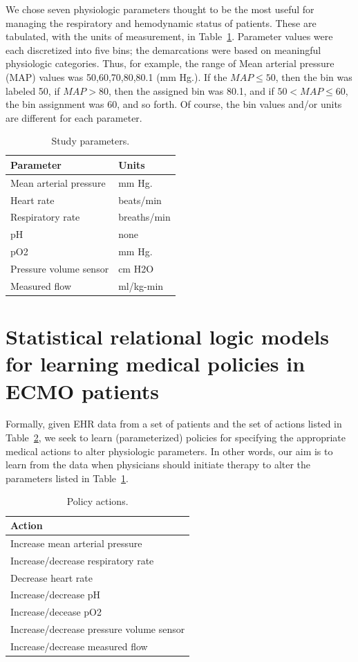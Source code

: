 \documentclass[letterpaper]{article}
\begin{document}
We chose seven physiologic parameters thought to be the most useful for managing the respiratory and hemodynamic status of patients. These are tabulated, with the units of measurement, in Table~\ref{tab:paramList}. Parameter values were each discretized into five bins; the demarcations were based on meaningful physiologic categories. Thus, for example, the range of Mean arterial pressure (MAP) values was {50,60,70,80,80.1} (mm Hg.). If the $MAP \leq 50$, then the bin was labeled 50, if $MAP> 80$, then the assigned bin was 80.1, and if $50< MAP \leq 60$, the bin assignment was 60, and so forth. Of course, the bin values and/or units are different for each parameter.
\begin{table}
\centering
\caption{Study parameters.}
\label{tab:paramList}
\begin{tabular}{|l|l|}
\hline
Parameter &  Units\\
\hline
Mean arterial pressure & mm Hg.\\
Heart rate & beats/min\\
Respiratory rate & breaths/min\\
pH & none\\
pO2 & mm Hg.\\
Pressure volume sensor & cm H2O\\
Measured flow & ml/kg-min\\
\hline
\end{tabular}
\end{table}

\section{Statistical relational logic models for learning medical policies in ECMO patients}

Formally, given EHR data from a set of patients and the set of actions listed in Table~\ref{tab:actionList}, we seek to learn (parameterized) policies for specifying the appropriate medical actions to alter physiologic parameters. In other words, our aim is to learn from the data when physicians should initiate therapy to alter the parameters listed in Table~\ref{tab:paramList}.
\begin{table}
\centering
\caption{Policy actions.}\label{tab:actionList}
\begin{tabular}{|l|}
\hline
Action\\
\hline
Increase mean arterial pressure\\
Increase/decrease respiratory rate\\
Decrease heart rate\\
Increase/decrease pH\\
Increase/decease pO2\\
Increase/decrease pressure volume sensor\\
Increase/decrease measured flow\\
\hline
\end{tabular}
\end{table}
\end{document}
